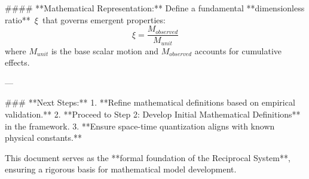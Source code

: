 #### **Mathematical Representation:**
Define a fundamental **dimensionless ratio** \( \, \xi \, \) that governs emergent properties:
\[
 \xi = \frac{M_{observed}}{M_{unit}}
\]
where \( M_{unit} \) is the base scalar motion and \( M_{observed} \) accounts for cumulative effects.

---

### **Next Steps:**
1. **Refine mathematical definitions based on empirical validation.**
2. **Proceed to Step 2: Develop Initial Mathematical Definitions** in the framework.
3. **Ensure space-time quantization aligns with known physical constants.**

This document serves as the **formal foundation of the Reciprocal System**, ensuring a rigorous basis for mathematical model development.

